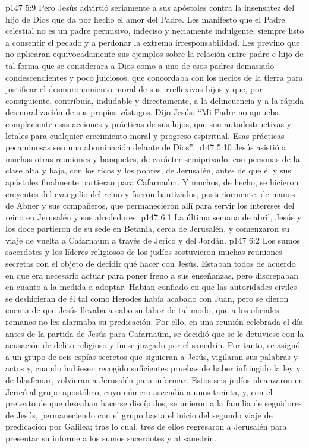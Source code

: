 \vs p147 5:9 Pero Jesús advirtió seriamente a sus apóstoles contra la insensatez del hijo de Dios que da por hecho el amor del Padre. Les manifestó que el Padre celestial no es un padre permisivo, indeciso y neciamente indulgente, siempre listo a consentir el pecado y a perdonar la extrema irresponsabilidad. Les previno que no aplicaran equivocadamente sus ejemplos sobre la relación entre padre e hijo de tal forma que se considerara a Dios como a uno de esos padres demasiado condescendientes y poco juiciosos, que concordaba con los necios de la tierra para justificar el desmoronamiento moral de sus irreflexivos hijos y que, por consiguiente, contribuía, indudable y directamente, a la delincuencia y a la rápida desmoralización de sus propios vástagos. Dijo Jesús: “Mi Padre no aprueba complaciente esas acciones y prácticas de sus hijos, que son autodestructivas y letales para cualquier crecimiento moral y progreso espiritual. Esas prácticas pecaminosas son una abominación delante de Dios”.
\vs p147 5:10 \pc Jesús asistió a muchas otras reuniones y banquetes, de carácter semiprivado, con personas de la clase alta y baja, con los ricos y los pobres, de Jerusalén, antes de que él y sus apóstoles finalmente partieran para Cafarnaúm. Y muchos, de hecho, se hicieron creyentes del evangelio del reino y fueron bautizados, posteriormente, de manos de Abner y sus compañeros, que permanecieron allí para servir los intereses del reino en Jerusalén y sus alrededores.
\vs p147 6:1 La última semana de abril, Jesús y los doce partieron de su sede en Betania, cerca de Jerusalén, y comenzaron su viaje de vuelta a Cafarnaúm a través de Jericó y del Jordán.
\vs p147 6:2 Los sumos sacerdotes y los líderes religiosos de los judíos sostuvieron muchas reuniones secretas con el objeto de decidir qué hacer con Jesús. Estaban todos de acuerdo en que era necesario actuar para poner freno a sus enseñanzas, pero discrepaban en cuanto a la medida a adoptar. Habían confiado en que las autoridades civiles se deshicieran de él tal como Herodes había acabado con Juan, pero se dieron cuenta de que Jesús llevaba a cabo su labor de tal modo, que a los oficiales romanos no les alarmaba su predicación. Por ello, en una reunión celebrada el día antes de la partida de Jesús para Cafarnaúm, se decidió que se le detuviese con la acusación de delito religioso y fuese juzgado por el sanedrín. Por tanto, se asignó a un grupo de seis espías secretos que siguieran a Jesús, vigilaran sus palabras y actos y, cuando hubiesen recogido suficientes pruebas de haber infringido la ley y de blasfemar, volvieran a Jerusalén para informar. Estos seis judíos alcanzaron en Jericó al grupo apostólico, cuyo número ascendía a unos treinta, y, con el pretexto de que deseaban hacerse discípulos, se unieron a la familia de seguidores de Jesús, permaneciendo con el grupo hasta el inicio del segundo viaje de predicación por Galilea; tras lo cual, tres de ellos regresaron a Jerusalén para presentar su informe a los sumos sacerdotes y al sanedrín.
